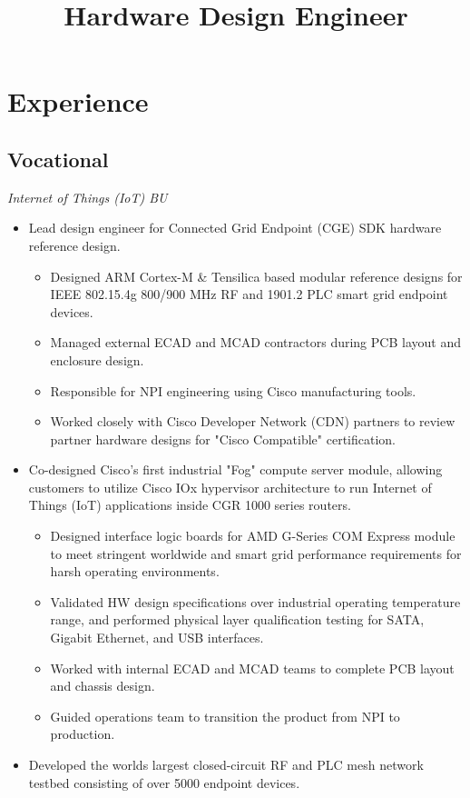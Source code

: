 \documentclass[11pt,a4paper]{moderncv}
\title{Hardware Design Engineer}
\begin{document}
\makecvtitle

\section{Experience}
\subsection{Vocational}
{
  \textit{Internet of Things (IoT) BU}
  \begin{itemize}
  \item Lead design engineer for Connected Grid Endpoint (CGE) SDK hardware reference design.
    \begin{itemize}
      \item Designed ARM Cortex-M \& Tensilica based modular reference designs for IEEE 802.15.4g 800/900 MHz RF and 1901.2 PLC smart grid endpoint devices.
      \item Managed external ECAD and MCAD contractors during PCB layout and enclosure design.
      \item Responsible for NPI engineering using Cisco manufacturing tools.
      \item Worked closely with Cisco Developer Network (CDN) partners to review partner hardware designs for "Cisco Compatible" certification.
    \end{itemize}
  \item Co-designed Cisco's first industrial "Fog" compute server module, allowing customers to utilize Cisco IOx hypervisor architecture to run Internet of Things (IoT) applications inside CGR 1000 series routers.
    \begin{itemize}
      \item Designed interface logic boards for AMD G-Series COM Express module to meet stringent worldwide and smart grid performance requirements for harsh operating environments.
      \item Validated HW design specifications over industrial operating temperature range, and performed physical layer qualification testing for SATA, Gigabit Ethernet, and USB interfaces.
      \item Worked with internal ECAD and MCAD teams to complete PCB layout and chassis design.
      \item Guided operations team to transition the product from NPI to production.
    \end{itemize}
  \item Developed the worlds largest closed-circuit RF and PLC mesh network testbed consisting of over 5000 endpoint devices.

\end{itemize}}
\end{document}

